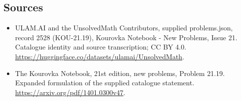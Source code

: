 \documentclass[11pt,a4paper]{article}
\begin{document}
\subsection{Sources}
\begin{itemize}
\item[S1] ULAM.AI and the UnsolvedMath Contributors, supplied problems.json, record 2528 (KOU-21.19), Kourovka Notebook - New Problems, Issue 21. Catalogue identity and source transcription; CC BY 4.0.
\url{https://huggingface.co/datasets/ulamai/UnsolvedMath}.
\item[S2] The Kourovka Notebook, 21st edition, new problems, Problem 21.19. Expanded formulation of the supplied catalogue statement.
\url{https://arxiv.org/pdf/1401.0300v47}.
\end{itemize}
\end{document}
